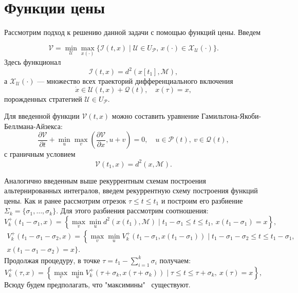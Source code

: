 \section{Функции цены}
Рассмотрим подход к решению данной задачи с помощью функций цены. Введем

\begin{equation*}
    \mathcal{V} = \min_{\mathcal{U}} \max_{x(\cdot)} \{\mathcal{I}(t,x) \mid \mathcal{U} \in 
     U_{\mathcal{P}}, \, x(\cdot) \in \mathcal{X}_{\mathcal{U}}(\cdot) \}.
\end{equation*}
Здесь функционал
\begin{equation*}
     \mathcal{I}(t,x) = d^2(x[t_1], \mathcal{M}),
\end{equation*}
а \( \mathcal{X}_{\mathcal{U}}(\cdot) \) --- множество всех траекторий дифференциального включения
\begin{equation*}
    \dot{x} \in \mathcal{U}(t,x) + \mathcal{Q}(t), \quad x(\tau) = x,
\end{equation*}
порожденных стратегией \( \mathcal{U} \in U_{\mathcal{P}} \).

Для введенной функции \( \mathcal{V}(t,x) \) можно составить уравнение Гамильтона-Якоби-Беллмана-Айзекса:
\begin{equation}\label{HJBI}
    \frac{\partial \mathcal{V}}{\partial t} + \min_u \max_v \left( \frac{\partial \mathcal{V}}
     {\partial x}, u + v \right) = 0, \quad u \in \mathcal{P}(t), \ v \in \mathcal{Q}(t),
\end{equation}
с граничным условием
\begin{equation}\label{HJBI_boundary}
    \mathcal{V}(t_1, x) = d^2(x, \mathcal{M}).
\end{equation}

Аналогично введенным выше рекуррентным схемам построения альтернированных интегралов, 
введем рекуррентную схему построения функций цены. Как и ранее рассмотрим отрезок
 \( \tau \le t \le t_1 \) и построим его разбиение \( \Sigma_k = \{ \sigma_1, \dots, \sigma_k \} \).
 Для этого разбиения рассмотрим соотношения:
\begin{equation*}
    V_k^+(t_1 - \sigma_1, x) = \left\{ \max_v \min_u d^2(x(t_1), \mathcal{M}) \mid t_1 -
     \sigma_1 \le t \le t_1, \ x(t_1 - \sigma_1) = x \right\},
\end{equation*}
\begin{multline*} 
    V_k^+(t_1 - \sigma_1 - \sigma_2, x) = \left\{ \max_v \min_u V_k^+(t_1 - \sigma_1, x(t_1 -
     \sigma_1)) \mid t_1 - \sigma_1 - \sigma_2 \le t \le t_1 - \sigma_1, \right. \\ 
    x(t_1 - \sigma_1 - \sigma_2) = x \Big\}.
\end{multline*}
Продолжая процедуру, в точке \( \tau = t_1 - \sum\limits_{i = 1}^k \sigma_i \) получаем:
\begin{equation*}
    V_k^+(\tau, x) = \left\{ \max_v \min_u V_k^+ (\tau + \sigma_k, x(\tau + \sigma_k)) \mid
     \tau \le t \le \tau + \sigma_k, \ x(\tau) = x \right\},
\end{equation*}
Всюду будем предполагать, что "максимины" \ существуют.

